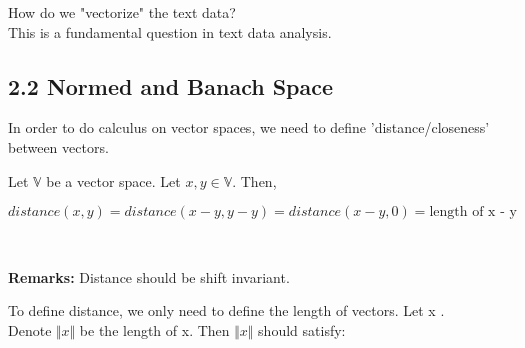 \documentclass{article}
\begin{document}
How do we "vectorize" the text data? \\ 
This is a fundamental question in text data analysis.


\pagebreak
\subsection*{2.2 Normed and Banach Space}
In order to do calculus on vector spaces, we need to define 'distance/closeness' between vectors. \\

\raggedright Let $\mathbb{V}$ be a vector space. Let $x, y \in \mathbb{V}$. Then, \\ 
    \begin{center}
        $distance(x,y) = distance(x - y, y - y) = distance (x - y, 0) = \text{length of x - y}$ 
    \end{center} \\

\raggedright \textbf{Remarks:} Distance should be shift invariant. \\ 
    
\raggedright To define distance, we only need to define the length of vectors.
Let x \in {}. \\ Denote $\Vert x \Vert$ be the length of x. Then $\Vert x \Vert$ should satisfy: 
\pagebreak
\end{document}
